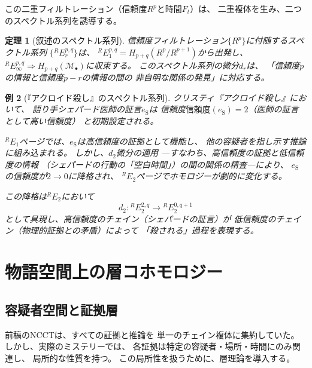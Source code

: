 \documentclass[12pt,twocolumn]{ltjsarticle}
\newtheorem{theorem}{定理}[section]
\newtheorem{example}[theorem]{例}
\newcommand{\Mys}{\mathcal{M}}
\begin{document}
この二重フィルトレーション（信頼度$R^p$と時間$F_t$）は、
二重複体を生み、二つのスペクトル系列を誘導する。

\begin{theorem}[叙述のスペクトル系列]
\label{thm:narration_spectral}
信頼度フィルトレーション$\{R^p\}$に付随するスペクトル系列
$\{{}^R E_r^{p,q}\}$は、
${}^R E_1^{p,q} = H_{p+q}(R^p / R^{p+1})$から出発し、
${}^R E_\infty^{p,q} \Rightarrow H_{p+q}(\Mys_\bullet)$に収束する。
このスペクトル系列の微分$d_r$は、
「信頼度$p$の情報と信頼度$p-r$の情報の間の
非自明な関係の発見」に対応する。
\end{theorem}

\begin{example}[『アクロイド殺し』のスペクトル系列]
\label{ex:ackroyd_spectral}
クリスティ『アクロイド殺し』において、
語り手シェパード医師の証言$e_{\text{S}}$は
信頼度$\text{信頼度}(e_{\text{S}}) = 2$（医師の証言として高い信頼度）
と初期設定される。

${}^R E_1$ページでは、$e_{\text{S}}$は高信頼度の証拠として機能し、
他の容疑者を指し示す推論に組み込まれる。
しかし、$d_2$微分の適用
---すなわち、高信頼度の証拠と低信頼度の情報
（シェパードの行動の「空白時間」）の間の関係の精査---により、
$e_{\text{S}}$の信頼度が$2 \to 0$に降格され、
${}^R E_2$ページでホモロジーが劇的に変化する。

この降格は${}^R E_2$において
\begin{equation}
d_2: {}^R E_2^{2, q} \to {}^R E_2^{0, q+1}
\end{equation}
として具現し、高信頼度のチェイン（シェパードの証言）が
低信頼度のチェイン（物理的証拠との矛盾）によって
「殺される」過程を表現する。
\end{example}


\section{物語空間上の層コホモロジー}
\label{sec:sheaf}

\subsection{容疑者空間と証拠層}

前稿のNCCTは、すべての証拠と推論を
単一のチェイン複体に集約していた。
しかし、実際のミステリーでは、
各証拠は特定の容疑者・場所・時間にのみ関連し、
局所的な性質を持つ。
この局所性を扱うために、層理論を導入する。
\end{document}
